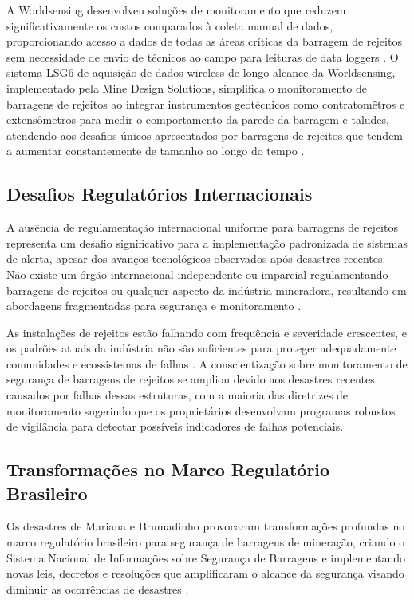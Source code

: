 A Worldsensing desenvolveu soluções de monitoramento que reduzem significativamente os custos comparados à coleta manual de dados, proporcionando acesso a dados de todas as áreas críticas da barragem de rejeitos sem necessidade de envio de técnicos ao campo para leituras de data loggers \cite{worldsensing2024canadian}. O sistema LSG6 de aquisição de dados wireless de longo alcance da Worldsensing, implementado pela Mine Design Solutions, simplifica o monitoramento de barragens de rejeitos ao integrar instrumentos geotécnicos como contratomêtros e extensômetros para medir o comportamento da parede da barragem e taludes, atendendo aos desafios únicos apresentados por barragens de rejeitos que tendem a aumentar constantemente de tamanho ao longo do tempo \cite{minedesign2021tailings}.

\subsection{Desafios Regulatórios Internacionais}

A ausência de regulamentação internacional uniforme para barragens de rejeitos representa um desafio significativo para a implementação padronizada de sistemas de alerta, apesar dos avanços tecnológicos observados após desastres recentes. Não existe um órgão internacional independente ou imparcial regulamentando barragens de rejeitos ou qualquer aspecto da indústria mineradora, resultando em abordagens fragmentadas para segurança e monitoramento \cite{londonmining2021explainer}.

As instalações de rejeitos estão falhando com frequência e severidade crescentes, e os padrões atuais da indústria não são suficientes para proteger adequadamente comunidades e ecossistemas de falhas \cite{earthworks2024safety}. A conscientização sobre monitoramento de segurança de barragens de rejeitos se ampliou devido aos desastres recentes causados por falhas dessas estruturas, com a maioria das diretrizes de monitoramento sugerindo que os proprietários desenvolvam programas robustos de vigilância para detectar possíveis indicadores de falhas potenciais.

\subsection{Transformações no Marco Regulatório Brasileiro}

Os desastres de Mariana e Brumadinho provocaram transformações profundas no marco regulatório brasileiro para segurança de barragens de mineração, criando o Sistema Nacional de Informações sobre Segurança de Barragens e implementando novas leis, decretos e resoluções que amplificaram o alcance da segurança visando diminuir as ocorrências de desastres \cite{brasil2020lei14066, synergia2024desastres}.

